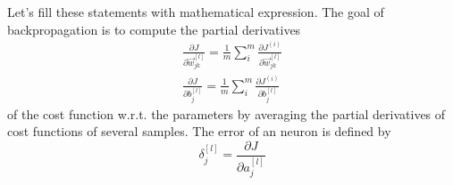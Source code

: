 Let's fill these statements with mathematical expression.
The goal of backpropagation is to compute the partial derivatives
\begin{subequations}
	\label{eq:backpropagation}
	\begin{align}
		\frac{\partial J}{\partial \vec{w}^{[l]}_{jk}}  = \frac{1}{m} \sum_{i}^{m} \frac{\partial J^{(i)}}{\partial \vec{w}^{[l]}_{jk}} \\
		\frac{\partial J}{\partial b^{[l]}_j} = \frac{1}{m} \sum_{i}^{m} \frac{\partial J^{(i)}}{\partial b^{[l]}_j}
	\end{align}
\end{subequations}
of the cost function w.r.t. the parameters by averaging the partial derivatives of cost functions of several samples.
The error of an neuron is defined by
\begin{equation}
	\delta^{[l]}_j = \frac{\partial J}{\partial a^{[l]}_j}
\end{equation}